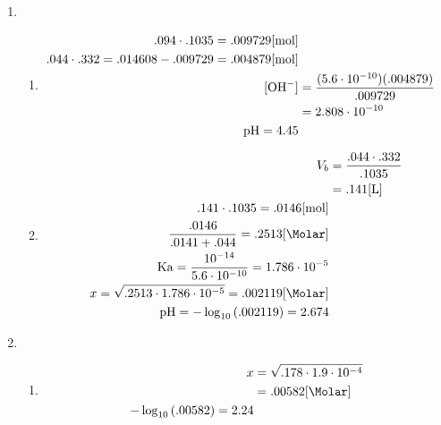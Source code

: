 \documentclass[12pt]{article}
\begin{document}
\begin{enumerate}
\begin{enumerate}
    \end{enumerate}

  \item

    \begin{enumerate}

      \item 

    \begin{equation}
      \begin{split}
        .094\cdot.1035=.009729[\si{\mole}]\\
        .044\cdot.332=.014608-.009729=.004879[\si{\mole}]\\
        [\ce{OH-}]&=\frac{(5.6\cdot10^{-10})(.004879)}{.009729}\\
        &= 2.808\cdot10^{-10}\\
        \ce{pH}=4.45
      \end{split}
      \label{11}
    \end{equation}

      \item 

    \begin{equation}
      \begin{split}
        V_b&= \frac{.044\cdot.332}{.1035}\\
        &= .141[\si{\liter}]\\
        .141\cdot.1035=.0146[\si{\mole}]\\
        \frac{.0146}{.0141+.044}=.2513[\si{\Molar}]\\
        \ce{Ka}=\frac{10^{-14}}{5.6\cdot10^{-10}}=1.786\cdot10^{-5}\\
        x=\sqrt{.2513\cdot1.786\cdot10^{-5}}=.002119[\si{\Molar}]\\
        \ce{pH}=-\log_{10}\left( .002119 \right)=2.674
      \end{split}
      \label{12}
    \end{equation}

    \end{enumerate}

  \item

    \begin{enumerate}

      \item 

    \begin{equation}
      \begin{split}
        x&=\sqrt{.178\cdot1.9\cdot10^{-4}}\\
        &= .00582[\si{\Molar}]\\
        -\log_{10}\left( .00582 \right)=2.24\\
      \end{split}
      \label{13}
    \end{equation}


\end{enumerate}
\end{enumerate}
\end{document}
